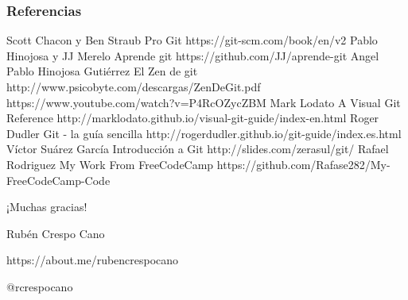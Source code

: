 \documentclass{beamer}
\begin{document}
\begin{frame}
\frametitle{Referencias}
\begin{thebibliography}{99}
\tiny
\bibitem{} Scott Chacon y Ben Straub
\newblock Pro Git
\newblock https://git-scm.com/book/en/v2
\bibitem{} Pablo Hinojosa y JJ Merelo
\newblock Aprende git
\newblock https://github.com/JJ/aprende-git
\bibitem{} Angel Pablo Hinojosa Gutiérrez
\newblock El Zen de git
\newblock http://www.psicobyte.com/descargas/ZenDeGit.pdf
\newblock https://www.youtube.com/watch?v=P4RcOZycZBM
\bibitem{} Mark Lodato
\newblock A Visual Git Reference
\newblock http://marklodato.github.io/visual-git-guide/index-en.html
\bibitem{} Roger Dudler 
\newblock Git - la guía sencilla
\newblock http://rogerdudler.github.io/git-guide/index.es.html
\bibitem{} Víctor Suárez García
\newblock  Introducción a Git
\newblock http://slides.com/zerasul/git/
\bibitem{} Rafael Rodriguez
\newblock My Work From FreeCodeCamp
\newblock https://github.com/Rafase282/My-FreeCodeCamp-Code
\end{thebibliography}
\end{frame}

\begin{frame}
\Huge{\centerline{¡Muchas gracias!}}
\vskip 1.50cm
\small{\centerline{Rubén Crespo Cano}}
\small{\centerline{https://about.me/rubencrespocano}}
\small{\centerline{@rcrespocano}}
\end{frame}
\end{document}
